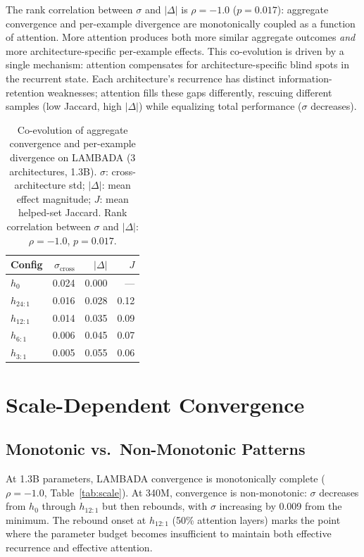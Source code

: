 \documentclass[11pt]{article}
\begin{document}
The rank correlation between $\sigma$ and $|\Delta|$ is $\rho = {-}1.0$ ($p = 0.017$): aggregate convergence and per-example divergence are monotonically coupled as a function of attention.
More attention produces both more similar aggregate outcomes \textit{and} more architecture-specific per-example effects.
This co-evolution is driven by a single mechanism: attention compensates for architecture-specific blind spots in the recurrent state.
Each architecture's recurrence has distinct information-retention weaknesses; attention fills these gaps differently, rescuing different samples (low Jaccard, high $|\Delta|$) while equalizing total performance ($\sigma$ decreases).

\begin{table}[t]
\centering
\caption{Co-evolution of aggregate convergence and per-example divergence on LAMBADA (3 architectures, 1.3B). $\sigma$: cross-architecture std; $|\Delta|$: mean effect magnitude; $J$: mean helped-set Jaccard. Rank correlation between $\sigma$ and $|\Delta|$: $\rho = {-}1.0$, $p = 0.017$.}
\label{tab:coevolution}
\small
\begin{tabular}{lrrr}
\toprule
Config & $\sigma_\text{cross}$ & $|\Delta|$ & $J$ \\
\midrule
$h_0$ & 0.024 & 0.000 & --- \\
$h_{24:1}$ & 0.016 & 0.028 & 0.12 \\
$h_{12:1}$ & 0.014 & 0.035 & 0.09 \\
$h_{6:1}$ & 0.006 & 0.045 & 0.07 \\
$h_{3:1}$ & 0.005 & 0.055 & 0.06 \\
\bottomrule
\end{tabular}
\end{table}

\section{Scale-Dependent Convergence}
\label{sec:scale}

\subsection{Monotonic vs.\ Non-Monotonic Patterns}

At 1.3B parameters, LAMBADA convergence is monotonically complete ($\rho = {-}1.0$, Table~\ref{tab:scale}).
At 340M, convergence is non-monotonic: $\sigma$ decreases from $h_0$ through $h_{12:1}$ but then rebounds, with $\sigma$ increasing by 0.009 from the minimum.
The rebound onset at $h_{12:1}$ (50\% attention layers) marks the point where the parameter budget becomes insufficient to maintain both effective recurrence and effective attention.
\end{document}
